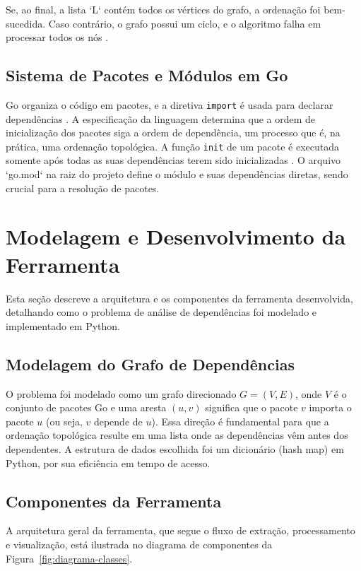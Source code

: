 \documentclass[12pt]{article}
\begin{document}
Se, ao final, a lista `L` contém todos os vértices do grafo, a ordenação foi bem-sucedida. Caso contrário, o grafo possui um ciclo, e o algoritmo falha em processar todos os nós \cite{kahn1962}.

\subsection{Sistema de Pacotes e Módulos em Go}
Go organiza o código em pacotes, e a diretiva \texttt{import} é usada para declarar dependências \cite{donovan2015go}. A especificação da linguagem determina que a ordem de inicialização dos pacotes siga a ordem de dependência, um processo que é, na prática, uma ordenação topológica. A função \texttt{init} de um pacote é executada somente após todas as suas dependências terem sido inicializadas \cite{GoSpec}. O arquivo `go.mod` na raiz do projeto define o módulo e suas dependências diretas, sendo crucial para a resolução de pacotes.

\section{Modelagem e Desenvolvimento da Ferramenta}
Esta seção descreve a arquitetura e os componentes da ferramenta desenvolvida, detalhando como o problema de análise de dependências foi modelado e implementado em Python.

\subsection{Modelagem do Grafo de Dependências}
O problema foi modelado como um grafo direcionado $G = (V, E)$, onde $V$ é o conjunto de pacotes Go e uma aresta $(u, v)$ significa que o pacote $v$ importa o pacote $u$ (ou seja, $v$ depende de $u$). Essa direção é fundamental para que a ordenação topológica resulte em uma lista onde as dependências vêm antes dos dependentes. A estrutura de dados escolhida foi um dicionário (hash map) em Python, por sua eficiência em tempo de acesso.

\subsection{Componentes da Ferramenta}
A arquitetura geral da ferramenta, que segue o fluxo de extração, processamento e visualização, está ilustrada no diagrama de componentes da Figura~\ref{fig:diagrama-classes}.
\end{document}
